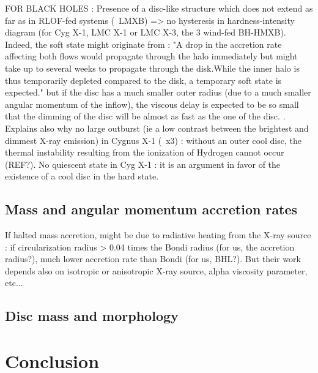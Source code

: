 \documentclass{aa}
\begin{document}
FOR BLACK HOLES :
Presence of a disc-like structure which does not extend as far as in RLOF-fed systems (~LMXB) => no hysteresis in hardness-intensity diagram (for Cyg X-1, LMC X-1 or LMC X-3, the 3 wind-fed BH-HMXB). Indeed, the soft state might originate from : "A drop in the accretion rate affecting both flows would propagate through the halo immediately but might take up to several weeks to propagate through the disk.While the inner halo is thus temporarily depleted compared to the disk, a temporary soft state is expected." but if the disc has a much smaller outer radius (due to a much smaller angular momentum of the inflow), the viscous delay is expected to be so small that the dimming of the disc will be almost as fast as the one of the disc. \citep{Smith2002}. Explains also why no large outburst (ie a low contrast between the brightest and dimmest X-ray emission) in Cygnus X-1 (~x3) \citep{Grinberg:2014ux} : without an outer cool disc, the thermal instability resulting from the ionization of Hydrogen cannot occur (REF?). No quiescent state in Cyg X-1 : it is an argument in favor of the existence of a cool disc in the hard state.

\subsection{Mass and angular momentum accretion rates}
\label{sec:mdot_ldot}

If halted mass accretion, might be due to radiative heating from the X-ray source \citep{Sugimura2018} : if circularization radius > 0.04 times the Bondi radius (for us, the accretion radius?), much lower accretion rate than Bondi (for us, BHL?). But their work depends also on isotropic or anisotropic X-ray source, alpha viscosity parameter, etc...

\subsection{Disc mass and morphology}
\label{sec:disc}

\section{Conclusion}
\label{sec:conc}
\end{document}

